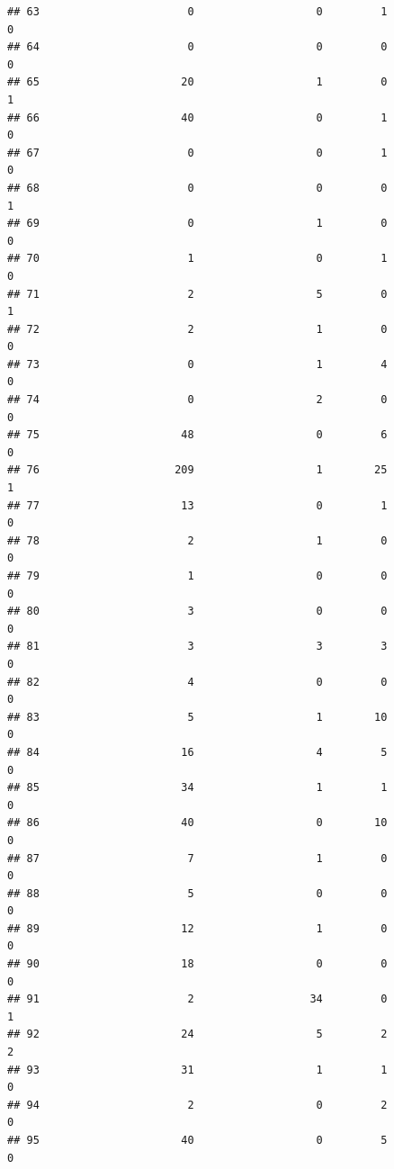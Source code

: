 \documentclass[
]{article}
\begin{document}
\begin{verbatim}
## 63                       0                   0         1                  0
## 64                       0                   0         0                  0
## 65                      20                   1         0                  1
## 66                      40                   0         1                  0
## 67                       0                   0         1                  0
## 68                       0                   0         0                  1
## 69                       0                   1         0                  0
## 70                       1                   0         1                  0
## 71                       2                   5         0                  1
## 72                       2                   1         0                  0
## 73                       0                   1         4                  0
## 74                       0                   2         0                  0
## 75                      48                   0         6                  0
## 76                     209                   1        25                  1
## 77                      13                   0         1                  0
## 78                       2                   1         0                  0
## 79                       1                   0         0                  0
## 80                       3                   0         0                  0
## 81                       3                   3         3                  0
## 82                       4                   0         0                  0
## 83                       5                   1        10                  0
## 84                      16                   4         5                  0
## 85                      34                   1         1                  0
## 86                      40                   0        10                  0
## 87                       7                   1         0                  0
## 88                       5                   0         0                  0
## 89                      12                   1         0                  0
## 90                      18                   0         0                  0
## 91                       2                  34         0                  1
## 92                      24                   5         2                  2
## 93                      31                   1         1                  0
## 94                       2                   0         2                  0
## 95                      40                   0         5                  0

\end{verbatim}
\end{document}
